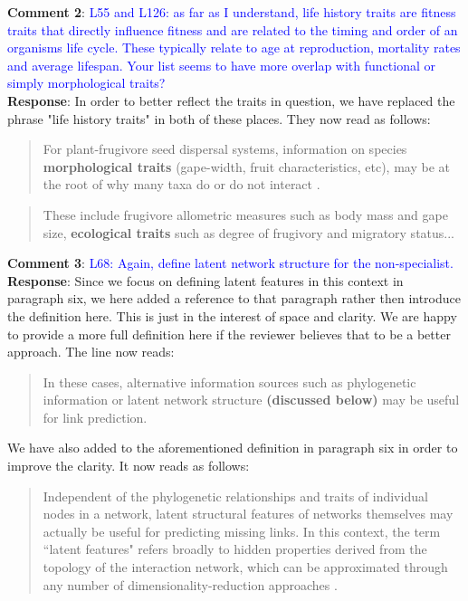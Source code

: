 \documentclass{article}
\begin{document}
\textbf{Comment 2}: \textcolor{blue}{ L55 and L126: as far as I understand, life history traits are fitness traits that directly influence fitness and are related to the timing and order of an organisms life cycle. These typically relate to age at reproduction, mortality rates and average lifespan. Your list seems to have more overlap with functional or simply morphological traits?}
\\
\textbf{Response}: In order to better reflect the traits in question, we have replaced the phrase "life history traits" in both of these places. They now read as follows: 
    \begin{quote}
For plant-frugivore seed dispersal systems, information on species \textbf{morphological traits} (gape-width, fruit characteristics, etc), may be at the root of why many taxa do or do not interact \cite{bender2018morphological,gonzalez2015relative, moran2010can}.
    \end{quote}
    \begin{quote}
 These include frugivore allometric measures such as body mass and gape size, \textbf{ecological traits} such as degree of frugivory and migratory status...
    \end{quote}
    
\textbf{Comment 3}: \textcolor{blue}{L68: Again, define latent network structure for the non-specialist.}
\\
\textbf{Response}: Since we focus on defining latent features in this context in paragraph six, we here added a reference to that paragraph rather then introduce the definition here. This is just in the interest of space and clarity. We are happy to provide a more full definition here if the reviewer believes that to be a better approach. The line now reads: 
\begin{quote}
    In these cases, alternative information sources such as phylogenetic information or latent network structure \textbf{(discussed below)} may be useful for link prediction. 
\end{quote}
We have also added to the aforementioned definition in paragraph six in order to improve the clarity. It now reads as follows:
\begin{quote}
   Independent of the phylogenetic relationships and traits of individual nodes in a network, latent structural features of networks themselves may actually be useful for predicting missing links. In this context, the term ``latent features" refers broadly to hidden properties derived from the topology of the interaction network, which can be approximated through any number of dimensionality-reduction approaches \cite{poisot2021imputing}.
\end{quote}
\\
\end{document}
